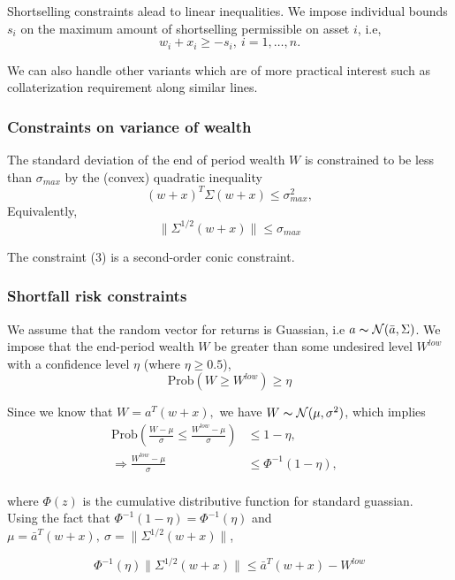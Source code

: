 \documentclass[a4paper]{article}
\begin{document}
Shortselling constraints alead to linear inequalities. We impose 
individual bounds $s_i$ on the maximum amount of shortselling permissible on asset $i$, i.e,
\begin{equation}
w_i + x_i \geq -s_i, \ i = 1,\ldots, n.
\end{equation}

We can also handle other variants which are of more practical interest such as collaterization requirement along similar lines.\cite{2}

\subsubsection{Constraints on variance of wealth}

The standard deviation of the end of period wealth $W$ is constrained to be less than $\sigma_{max}$ by
the (convex) quadratic inequality
$$
(w + x)^T \Sigma (w + x) \leq \sigma_{max}^2,
$$
Equivalently,
\begin{equation}
\|\Sigma^{1/2}(w+x)\| \leq \sigma_{max}
\end{equation}

The constraint (3) is a second-order conic constraint.
\subsubsection{Shortfall risk constraints}

We assume that the random vector for returns is Guassian, i.e $a \thicksim \mathcal{N}(\bar{a},\Sigma)$. We impose that the end-period wealth $W$ be greater than some undesired level $W^{low}$
with a confidence level $\eta$ (where $\eta \geq 0.5$), 
\[
\text{Prob}(W \geq W^{low}) \geq \eta
\]

Since we know that $W = a^T(w+x),$ we have $W \thicksim \mathcal{N}(\mu,\sigma^2)$, which implies
\begin{align*}
\text{Prob}(\frac{W-\mu}{\sigma} \leq \frac{W^{low}-\mu}{\sigma}) &\leq 1- \eta, & \\
 \Rightarrow \frac{W^{low}-\mu}{\sigma} &\leq \Phi^{-1}(1-\eta),&\\
\end{align*}

where $\Phi(z)$ is the cumulative distributive function for standard guassian.\\[0.2em]
Using the fact that $\Phi^{-1}(1-\eta)= \Phi^{-1}(\eta)$ and $\mu= \bar{a}^T(w+x),\ \sigma=\|\Sigma^{1/2}(w+x) \|$,

\begin{equation}
\Phi^{-1}(\eta)\|\Sigma^{1/2}(w+x)\| \leq \bar{a}^T(w+x)- W^{low}
\end{equation}
\end{document}
